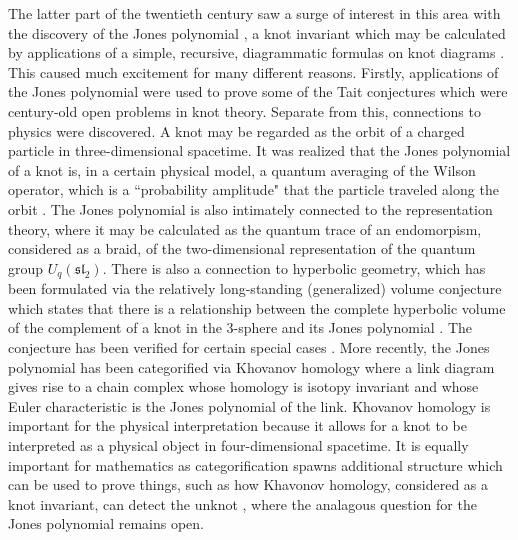 The latter part of the twentieth century saw a surge of interest in this area with the discovery of the Jones polynomial \cite{Jon85}, a knot invariant which may be calculated by applications of a simple, recursive, diagrammatic formulas on knot diagrams \cite{Kau87}. This caused much excitement for many different reasons. Firstly, applications of the Jones polynomial were used to prove some of the Tait conjectures \cite{Kau87} \cite{Thi88} which were century-old open problems in knot theory. Separate from this, connections to physics were discovered. A knot may be regarded as the orbit of a charged particle in three-dimensional spacetime. It was realized that the Jones polynomial of a knot is, in a certain physical model, a quantum averaging of the Wilson operator, which is a ``probability amplitude" that the particle traveled along the orbit \cite{Wit89}. The Jones polynomial is also intimately connected to the representation theory, where it may be calculated as the quantum trace of an endomorpism, considered as a braid, of the two-dimensional representation of the quantum group $U_q(\mathfrak{sl}_2)$. There is also a connection to hyperbolic geometry, which has been formulated via the relatively long-standing (generalized) volume conjecture which states that there is a relationship between the complete hyperbolic volume of the complement of a knot in the $3$-sphere and its Jones polynomial \cite{Hik07}. The conjecture has been verified for certain special cases \cite{KT00}. More recently, the Jones polynomial has been categorified via Khovanov homology \cite{Kho00} where a link diagram gives rise to a chain complex whose homology is isotopy invariant and whose Euler characteristic is the Jones polynomial of the link. Khovanov homology is important for the physical interpretation because it allows for a knot to be interpreted as a physical object in four-dimensional spacetime. It is equally important for mathematics as categorification spawns additional structure which can be used to prove things, such as how Khavonov homology, considered as a knot invariant, can detect the unknot \cite{KM11}, where the analagous question for the Jones polynomial remains open.

